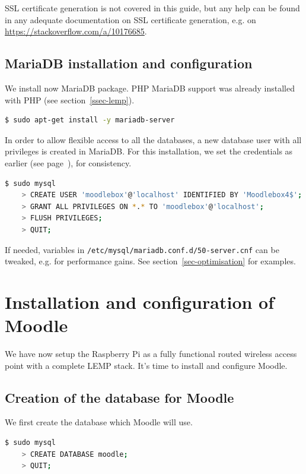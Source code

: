 \documentclass[12pt]{article}
\begin{document}
SSL certificate generation is not covered in this guide, but any help can be
found in any adequate documentation on SSL certificate generation, e.g. on \url{https://stackoverflow.com/a/10176685}.

\subsection{MariaDB installation and configuration}\label{ssec-mariadb}

We install now MariaDB package.
PHP MariaDB support was already installed with PHP (see section~\ref{ssec-lemp}).
\begin{lstlisting}[language=bash]
$ sudo apt-get install -y mariadb-server
\end{lstlisting}

In order to allow flexible access to all the databases, a new database user with all privileges is created in MariaDB.
For this installation, we set the credentials as earlier (see page~\pageref{ssec-new-account}), for consistency.

\begin{lstlisting}[language=bash]
$ sudo mysql
    > CREATE USER 'moodlebox'@'localhost' IDENTIFIED BY 'Moodlebox4$';
    > GRANT ALL PRIVILEGES ON *.* TO 'moodlebox'@'localhost';
    > FLUSH PRIVILEGES;
    > QUIT;
\end{lstlisting}

If needed, variables in \lstinline{/etc/mysql/mariadb.conf.d/50-server.cnf} can be tweaked, e.g. for performance gains. See section~\ref{sec-optimisation} for examples.

\section{Installation and configuration of Moodle}

We have now setup the Raspberry Pi as a fully functional routed wireless access point with a complete LEMP stack.
It's time to install and configure Moodle.

\subsection{Creation of the database for Moodle}

We first create the database which Moodle will use.
\begin{lstlisting}[language=bash]
$ sudo mysql
    > CREATE DATABASE moodle;
    > QUIT;
\end{lstlisting}
\end{document}
